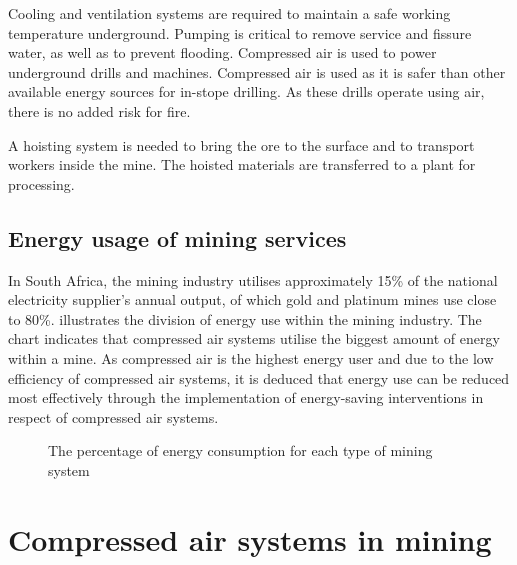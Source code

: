 	 Cooling and ventilation systems are required to maintain a safe working temperature underground. Pumping is critical to remove service and fissure water, as well as to prevent flooding. Compressed air is used to power underground drills and machines. Compressed air is used as it is safer than other available energy sources for in-stope drilling. As these drills operate using air, there is no added risk for fire.
	 \par
	  A hoisting system is needed to bring the ore to the surface and to transport workers inside the mine. The hoisted materials are transferred to a plant for processing.  
		
		\subsection{Energy usage of mining services}
		
			In South Africa, the mining industry utilises approximately 15\% of the national electricity supplier's annual output, of which gold and platinum mines use  close to 80\%\footnotemark[1].  illustrates the division of energy use within the mining industry. The chart indicates that compressed air systems utilise the biggest amount of energy within a mine. As compressed air is the highest energy user and due to the low efficiency of compressed air systems, it is deduced that energy use can be reduced most effectively through the implementation of energy-saving interventions in respect of compressed air systems.
			\begin{figure}[h]
				\centering
				\fbox{}
				\caption[The percentage of energy consumption for each type of mining system]{The percentage of energy consumption for each type of mining system \cite{le2005energy}}
				\label{fig: Energy Split}
			\end{figure}
\section{Compressed air systems in mining}

